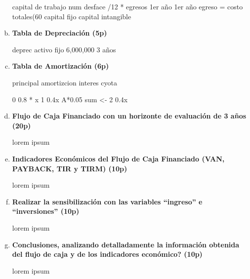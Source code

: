 \begin{enumerate}[(a)]

        capital de trabajo
            num desface /12  * egresos 1er año
            1er año egreso = costo totales(60%
        capital fijo
        capital intangible

        

\newpage
    \item {\bf Tabla de Depreciación (5p)}


          deprec activo fijo 6,000,000  3 años

\newpage
    \item {\bf Tabla de Amortización (6p)}


          principal    amortizcion interes cyota

        0 0.8 * x       
        1              0.4x         A*0.05  sum <-
        2              0.4x

\newpage
    \item {\bf Flujo de Caja Financiado con un horizonte de evaluación de 3 años (20p)}


          lorem ipsum

\newpage
    \item {\bf Indicadores Económicos  del Flujo de Caja Financiado (VAN, PAYBACK, TIR y TIRM) (10p)}


          lorem ipsum

\newpage
    \item {\bf Realizar la sensibilización con las variables “ingreso” e “inversiones” (10p)}


          lorem ipsum

\newpage
    \item {\bf Conclusiones, analizando detalladamente la información obtenida del flujo de caja y de los indicadores económico? (10p)}


          lorem ipsum

\end{enumerate}
